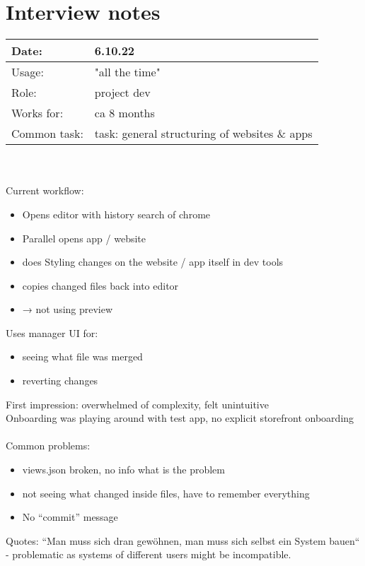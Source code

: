 \chapter{Interview notes}
\label{app:interviews}

\begin{tabularx}{\linewidth}{lX}
  Date: & 6.10.22 \\
  \hline
  Usage: & "all the time"\\
  \hline
  Role: & project dev \\
  \hline
  Works for: & ca 8 months \\
  \hline
  Common task: & task: general structuring of websites \& apps
\end{tabularx}
\\\\
Current workflow:
\begin{itemize}[nosep]
  \item Opens editor with history search of chrome
  \item Parallel opens app / website
  \item does Styling changes on the website / app itself in dev tools
  \item copies changed files back into editor
  \item → not using preview
\end{itemize}

Uses manager UI for:
\begin{itemize}[nosep]
  \item seeing what file was merged
  \item reverting changes
\end{itemize}

First impression: overwhelmed of complexity, felt unintuitive\\
Onboarding was playing around with test app, no explicit storefront onboarding
\\\\
Common problems:
\begin{itemize}[nosep]
  \item views.json broken, no info what is the problem
  \item not seeing what changed inside files, have to remember everything
  \item No “commit” message
\end{itemize}

Quotes:
“Man muss sich dran gewöhnen, man muss sich selbst ein System bauen“ - problematic as systems of different users might be incompatible.

